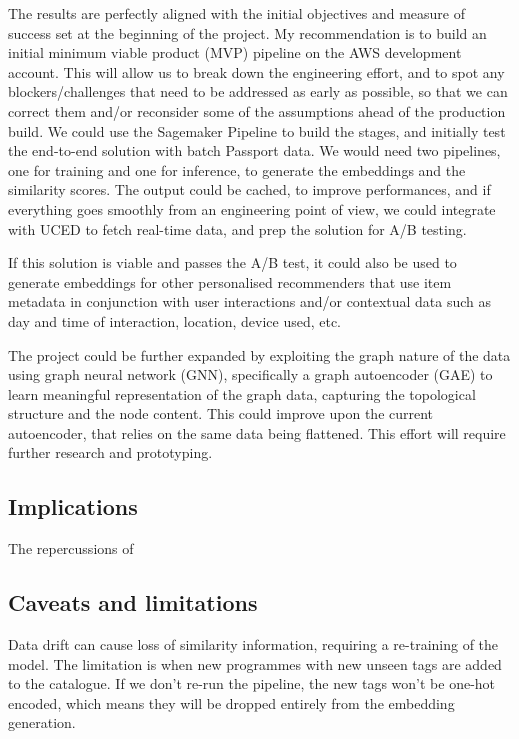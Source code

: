 The results are perfectly aligned with the initial objectives and measure of success set at the beginning of the project.
My recommendation is to build an initial minimum viable product (MVP) pipeline on the AWS development account.
This will allow us to break down the engineering effort, and to spot any blockers/challenges that need to be addressed
as early as possible, so that we can correct them and/or reconsider some of the assumptions ahead of the production build.
We could use the Sagemaker Pipeline to build the stages, and initially test the end-to-end solution with batch Passport data.
We would need two pipelines, one for training and one for inference, to generate the embeddings and the similarity scores.
The output could be cached, to improve performances, and if everything goes smoothly from an engineering point of view,
we could integrate with UCED to fetch real-time data, and prep the solution for A/B testing.

If this solution is viable and passes the A/B test, it could also be used to generate embeddings for
other personalised recommenders that use item metadata in conjunction with user interactions and/or contextual data such as
day and time of interaction, location, device used, etc.

The project could be further expanded by exploiting the graph nature of the data using graph neural network (GNN), specifically a
graph autoencoder (GAE) to learn meaningful representation of the graph data, capturing the topological structure and the node content.
This could improve upon the current autoencoder, that relies on the same data being flattened.
This effort will require further research and prototyping.

\subsection{Implications}

The repercussions of

\subsection{Caveats and limitations}

Data drift can cause loss of similarity information, requiring a re-training of the model.
The limitation is when new programmes with new unseen tags are added to the catalogue.
If we don't re-run the pipeline, the new tags won't be one-hot encoded, which means they will be dropped entirely from the embedding generation.
